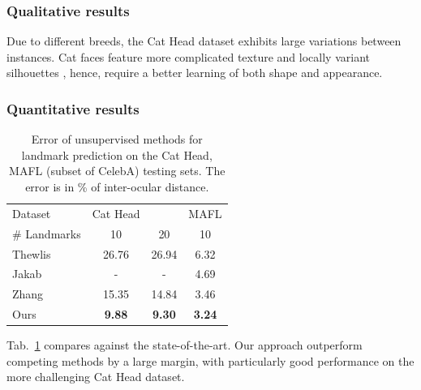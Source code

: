 		\subsubsection{Qualitative results}
			Due to different breeds, the Cat Head dataset exhibits large variations between instances. Cat faces feature more complicated texture and locally variant silhouettes \cite{zhang08cathead}, hence, require a better learning of both shape and appearance.

		\subsubsection{Quantitative results}
			\begin{table}[t]
				\caption{Error of unsupervised methods for landmark prediction on the Cat Head, MAFL (subset of CelebA) testing sets. The error is in \% of inter-ocular distance.}
				\label{tab:faces}
				\centering
				\begin{tabular}{l|ccc}
				\hline
				Dataset & Cat Head &  & MAFL \\
				  \# Landmarks &10 & 20  & 10  \\
				  \hline
				 Thewlis \cite{thewlis17}
				 & 26.76 & 26.94 & 6.32    \\
				 Jakab \cite{jakab18}
				 & - & - & 4.69  \\
				 Zhang \cite{zhang18}
				 & 15.35 & 14.84 & 3.46  \\
				  Ours & \textbf{9.88}  & \textbf{9.30} & \textbf{3.24}  \\ \hline  %
				\end{tabular}
			\end{table}
			Tab.~\ref{tab:faces} compares against the state-of-the-art.
			Our approach outperform competing methods by a large margin, with particularly good performance on the more challenging Cat Head dataset.
